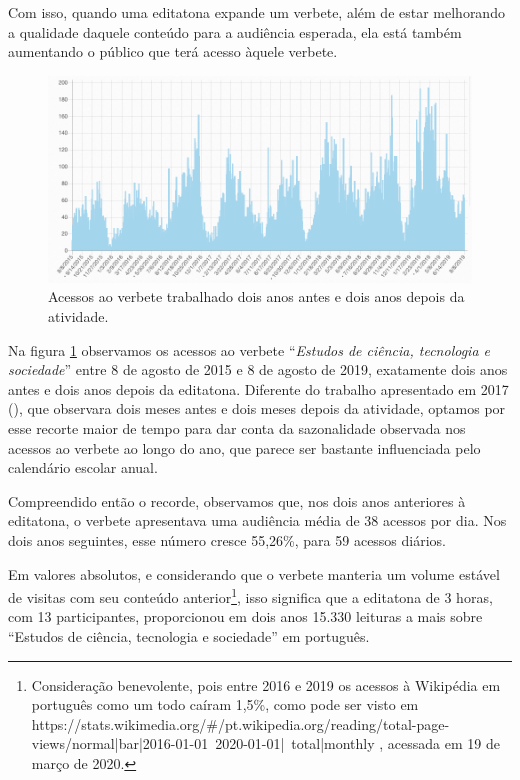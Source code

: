 Com isso, quando uma editatona expande um verbete, além de estar melhorando a qualidade daquele conteúdo para a audiência esperada, ela está também aumentando o público que terá acesso àquele verbete.

\begin{figure}[H]
    \centering
    \includegraphics[width=1\textwidth]{Images/acessos-estudos-cts.png}
    \caption{Acessos ao verbete trabalhado dois anos antes e dois anos depois da atividade.}
    \label{fig:acessos-estudos-cts}
\end{figure}

Na figura \ref{fig:acessos-estudos-cts} observamos os acessos ao verbete ``\textit{Estudos de ciência, tecnologia e sociedade}'' entre 8 de agosto de 2015 e 8 de agosto de 2019, exatamente dois anos antes e dois anos depois da editatona. Diferente do trabalho apresentado em 2017 (\cite{andrade_historias_2017}), que observara dois meses antes e dois meses depois da atividade, optamos por esse recorte maior de tempo para dar conta da sazonalidade observada nos acessos ao verbete ao longo do ano, que parece ser bastante influenciada pelo calendário escolar anual.

Compreendido então o recorde, observamos que, nos dois anos anteriores à editatona, o verbete apresentava uma audiência média de 38 acessos por dia. Nos dois anos seguintes, esse número cresce 55,26\%, para 59 acessos diários.

Em valores absolutos, e considerando que o verbete manteria um volume estável de visitas com seu conteúdo anterior\footnote{Consideração benevolente, pois entre 2016 e 2019 os acessos à Wikipédia em português como um todo caíram 1,5\%, como pode ser visto em https://stats.wikimedia.org/\#/pt.wikipedia.org/reading/total-page-views/normal|bar|2016-01-01~2020-01-01|~total|monthly , acessada em 19 de março de 2020.}, isso significa que a editatona de 3 horas, com 13 participantes, proporcionou em dois anos 15.330 leituras a mais sobre ``Estudos de ciência, tecnologia e sociedade'' em português.

